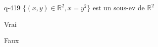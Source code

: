 \begin{truefalse}{q-419}
$\{ (x,y) \in \mathbb R^2, x=y^2\}$ est un sous-ev de $\mathbb R^2$
\item Vrai
\item* Faux
\end{truefalse}

